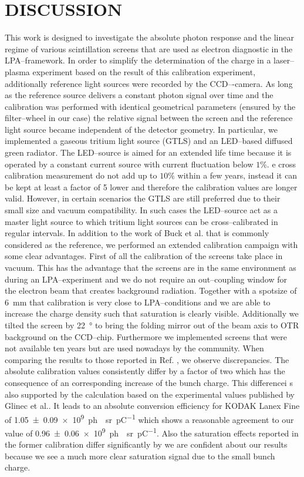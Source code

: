 \documentclass[%
preprint,
amsmath,
amssymb,
aip,
rsi, 
numerical,
floatfix,
]{revtex4-1}
\newcommand{\myCite}[1]{\textcolor{blue}{\cite{#1}}}
\newcommand{\myOnlineCite}[1]{\textcolor{blue}{\onlinecite{#1}}}
\begin{document}
\section{\label{Cn} DISCUSSION}
This work is designed to investigate the absolute photon response and the linear regime of various scintillation screens that are used as electron diagnostic in the LPA--framework.
In order to simplify the determination of the charge in a laser--plasma experiment based on the result of this calibration experiment, additionally reference light sources were recorded by the CCD–-camera. 
As long as the reference source delivers a constant photon signal over time and the calibration was performed with identical geometrical parameters (ensured by the filter--wheel in our case) the relative signal between the screen and the reference light source became independent of the detector geometry.
In particular, we implemented a gaseous tritium light source (GTLS) and an LED--based diffused green radiator.
The LED--source is aimed for an extended life time because it is operated by a constant current source with current fluctuation below $1\%$.
e cross calibration measurement do not add up to $10\%$ within a few years, instead it can be kept at least a factor of 5 lower and therefore the calibration values are longer valid.
However, in certain scenarios the GTLS are still preferred due to their small size and vacuum compatibility.
In such cases the LED--source act as a master light source to which tritium light sources can be cross--calibrated in regular intervals.
In addition to the work of Buck et al.\myCite{Buck2010} that is commonly considered as the reference, we performed an extended calibration campaign with some clear advantages.
First of all the calibration of the screens take place in vacuum.
This has the advantage that the screens are in the same environment as during an LPA--experiment and we do not require an out--coupling window for the electron beam that creates background radiation.
Together with a spotsize of \SI{6}{\milli\meter} that calibration is very close to LPA--conditions and we are able to increase the charge density such that saturation is clearly visible.
Additionally we tilted the screen by \SI{22}{\degree} to bring the folding mirror out of the beam axis to OTR background on the CCD--chip.
Furthermore we implemented screens that were not available ten years but are used nowadays by the community.
When comparing the results to those reported in Ref. \myOnlineCite{Buck2010}, we observe discrepancies.
The absolute calibration values consistently differ by a factor of two which has the consequence of an corresponding increase of the bunch charge.   
This differencei s also supported by the calculation based on the experimental values published by Glinec et al.\myCite{Glinec2006}. 
It leads to an absolute conversion efficiency for KODAK Lanex Fine of \SI[separate-uncertainty = true]{1.05(9)e9}{ph \per \steradian \per \pico \coulomb} which shows a reasonable agreement to our value of \SI[separate-uncertainty = true]{0.96(6)e9}{ph \per \steradian \per \pico \coulomb}. 
Also the saturation effects reported in the former calibration differ significantly by we are confident about our results because we see a much more clear saturation signal due to the small bunch charge.
\end{document}
